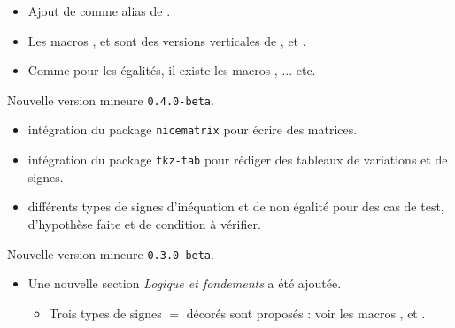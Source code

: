 \documentclass[12pt,a4paper]{book}
\begin{document}
\begin{description}
\begin{itemize}[itemsep=.5em]
\begin{itemize}[itemsep=.5em]
        \item Ajout de  comme alias de .

        \item Les macros ,  et  sont des versions verticales de ,  et .

        \item Comme pour les égalités, il existe les macros ,  ... etc.
    \end{itemize}
\end{itemize}

\end{description}\begin{description}
\medskip
\item[2019-09-06] Nouvelle version mineure \verb+0.4.0-beta+.

\begin{itemize}[itemsep=.5em]
    \item {}
          intégration du package \verb+nicematrix+ pour écrire des matrices.




    \item {}
          intégration du package \verb+tkz-tab+ pour rédiger des tableaux de variations et de signes.




    \item {}
          différents types de signes d'inéquation et de non égalité pour des cas de test, d'hypothèse faite et de condition à vérifier.

\end{itemize}

\end{description}\begin{description}
\medskip
\item[2019-07-23] Nouvelle version mineure \verb+0.3.0-beta+.

\begin{itemize}[itemsep=.5em]
    \item Une nouvelle section \emph{\og Logique et fondements \fg} a été ajoutée.
    \begin{itemize}[itemsep=.5em]
        \item Trois types de signes $=$ décorés sont proposés : voir les macros  ,  et .


\end{itemize}
\end{itemize}
\end{description}
\end{document}
